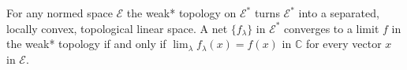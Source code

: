 For any normed space $\mathcal{E}$ the weak* topology on $\mathcal{E}^*$ turns $\mathcal{E}^*$ into a separated, locally convex, topological linear space. A net $\{f_\lambda\}$ in $\mathcal{E}^*$ converges to a limit $f$ in the weak* topology if and only if $\lim_\lambda f_\lambda(x) = f(x)$ in $\mathbb{C}$ for every vector $x$ in $\mathcal{E}$.
